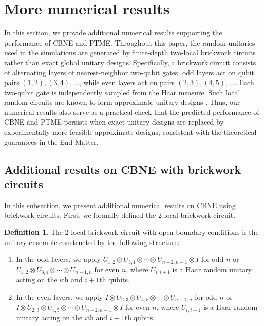 \documentclass[aps,prl,twocolumn,nofootinbib,superscriptaddress,10pt]{revtex4-2}
\theoremstyle{plain}
\theoremstyle{definition}
\newtheorem{defn}{Definition}
\begin{document}
\section{More numerical results}\label{sec:moreNumerical}

In this section, we provide additional numerical results supporting the performance of CBNE and PTME. 
Throughout this paper, the random unitaries used in the simulations are generated by finite-depth two-local brickwork circuits rather than exact global unitary designs. 
Specifically, a brickwork circuit consists of alternating layers of nearest-neighbor two-qubit gates: odd layers act on qubit pairs \((1,2),(3,4),\ldots\), while even layers act on pairs \((2,3),(4,5),\ldots\). 
Each two-qubit gate is independently sampled from the Haar measure. 
Such local random circuits are known to form approximate unitary designs
\cite{Brandao2016LocalDesign,Haferkamp2022Interleaved}. 
Thus, our numerical results also serve as a practical check that the predicted performance of CBNE and PTME persists when exact unitary designs are replaced by experimentally more feasible approximate designs, consistent with the     theoretical guarantees in the End Matter. 

\subsection{Additional results on CBNE with brickwork circuits}
In this subsection, we present additional numerical results on CBNE using brickwork circuits. First, we formally defined the 2-local brickwork circuit.
\begin{defn}\label{def:Brickwork}
The 2-local brickwork circuit with open boundary conditions is the unitary ensemble constructed by the following structure:
\begin{enumerate}
    \item In the odd layers, we apply $U_{1,2}\otimes U_{3,4}\otimes \cdots\otimes U_{n-2, n-1}\otimes I$ for odd $n$ or $U_{1,2}\otimes U_{3,4}\otimes \cdots\otimes U_{n-1,n}$ for even $n$, where $U_{i,i+1}$ is a Haar random unitary acting on the $i$th and $i+1$th qubits.
    \item In the even layers, we apply $I\otimes U_{2,3}\otimes U_{4,5}\otimes\cdots\otimes U_{n-1,n}$ for odd $n$ or $I \otimes U_{2,3}\otimes U_{4,5}\otimes\cdots\otimes U_{n-2,n-1}\otimes I$ for even $n$, where $U_{i,i+1}$ is a Haar random unitary acting on the $i$th and $i+1$th qubits.
\end{enumerate}
\end{defn}
\end{document}
